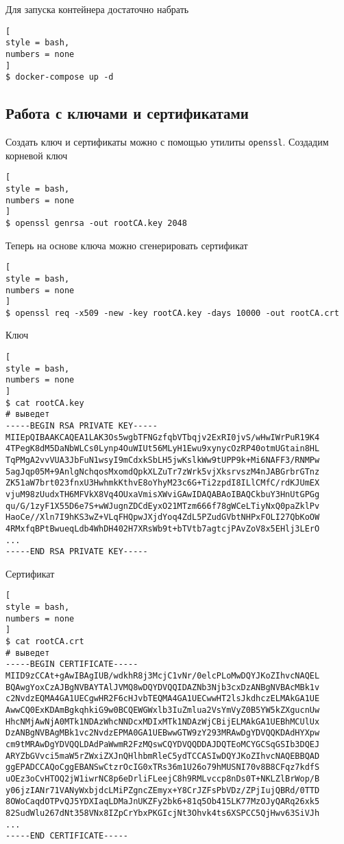 \documentclass[%
	11pt,
	a4paper,
	utf8,
		]{article}
\begin{document}
Для запуска контейнера достаточно набрать
\begin{lstlisting}[
style = bash,
numbers = none
]
$ docker-compose up -d
\end{lstlisting}

\subsection{Работа с ключами и сертификатами}

Создать ключ и сертификаты можно с помощью утилиты \texttt{openssl}. Создадим корневой ключ
\begin{lstlisting}[
style = bash,
numbers = none
]
$ openssl genrsa -out rootCA.key 2048
\end{lstlisting}

Теперь на основе ключа можно сгенерировать сертификат
\begin{lstlisting}[
style = bash,
numbers = none
]
$ openssl req -x509 -new -key rootCA.key -days 10000 -out rootCA.crt
\end{lstlisting}

Ключ
\begin{lstlisting}[
style = bash,
numbers = none
]
$ cat rootCA.key
# выведет
-----BEGIN RSA PRIVATE KEY-----
MIIEpQIBAAKCAQEA1LAK3Os5wgbTFNGzfqbVTbqjv2ExRI0jvS/wHwIWrPuR19K4
4TPegK8dM5DaNbWLCs0Lynp4OuWIUt56MLyH1Ewu9xynycOzRP40otmUGtain8HL
TqPMgA2vvVUA3JbFuN1wsyI9mCdxkSbLH5jwKslkWw9tUPP9k+Mi6NAFF3/RNMPw
5agJqp05M+9AnlgNchqosMxomdQpkXLZuTr7zWrk5vjXksrvszM4nJABGrbrGTnz
ZK51aW7brt023fnxU3HwhmkKthvE8oYhyM23c6G+Ti2zpdI8ILlCMfC/rdKJUmEX
vjuM98zUudxTH6MFVkX8Vq4OUxaVmisXWviGAwIDAQABAoIBAQCkbuY3HnUtGPGg
qu/G/1zyF1X55D6e7S+wWJugnZDCdEyxO21MTzm666f78gWCeLTiyNxQ0paZklPv
HaoCe//Xln7I9hKS3wZ+VLqFHQpwJXjdYoq4ZdL5PZudGVbtNHPxFOLI27QbKoOW
4RMxfqBPtBwueqLdb4WhDH402H7XRsWb9t+bTVtb7agtcjPAvZoV8x5EHlj3LErO
...
-----END RSA PRIVATE KEY-----
\end{lstlisting}

Сертификат
\begin{lstlisting}[
style = bash,
numbers = none
]
$ cat rootCA.crt
# выведет
-----BEGIN CERTIFICATE-----
MIID9zCCAt+gAwIBAgIUB/wdkhR8j3McjC1vNr/0elcPLoMwDQYJKoZIhvcNAQEL
BQAwgYoxCzAJBgNVBAYTAlJVMQ8wDQYDVQQIDAZNb3Njb3cxDzANBgNVBAcMBk1v
c2NvdzEQMA4GA1UECgwHR2F6cHJvbTEQMA4GA1UECwwHT2lsJkdhczELMAkGA1UE
AwwCQ0ExKDAmBgkqhkiG9w0BCQEWGWxlb3IuZmlua2VsYmVyZ0B5YW5kZXgucnUw
HhcNMjAwNjA0MTk1NDAzWhcNNDcxMDIxMTk1NDAzWjCBijELMAkGA1UEBhMCUlUx
DzANBgNVBAgMBk1vc2NvdzEPMA0GA1UEBwwGTW9zY293MRAwDgYDVQQKDAdHYXpw
cm9tMRAwDgYDVQQLDAdPaWwmR2FzMQswCQYDVQQDDAJDQTEoMCYGCSqGSIb3DQEJ
ARYZbGVvci5maW5rZWxiZXJnQHlhbmRleC5ydTCCASIwDQYJKoZIhvcNAQEBBQAD
ggEPADCCAQoCggEBANSwCtzrOcIG0xTRs36m1U26o79hMUSNI70v8B8CFqz7kdfS
uOEz3oCvHTOQ2jW1iwrNC8p6eDrliFLeejC8h9RMLvccp8nDs0T+NKLZlBrWop/B
y06jzIANr71VANyWxbjdcLMiPZgncZEmyx+Y8CrJZFsPbVDz/ZPjIujQBRd/0TTD
8OWoCaqdOTPvQJ5YDXIaqLDMaJnUKZFy2bk6+81q5Ob415LK77MzOJyQARq26xk5
82SudWlu267dNt358VNx8IZpCrYbxPKGIcjNt3Ohvk4ts6XSPCC5QjHwv63SiVJh
...
-----END CERTIFICATE-----
\end{lstlisting}
\end{document}
